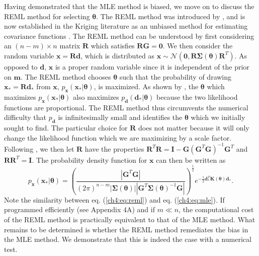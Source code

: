 Having demonstrated that the MLE method is biased, we move on to
discuss the REML method for selecting $\mathbf{\theta}$.  The REML
method was introduced by \citet{Patterson1971}, and is now established
in the Kriging literature as an unbiased method for estimating
covariance functions \citep[e.g.,][]{Cressie1992}. The REML method can
be understood by first considering an $(n-m)\times n$ matrix
$\mathbf{R}$ which satisfies $\mathbf{R}\mathbf{G}=\mathbf{0}$.  We
then consider the random variable $\mathbf{x}=\mathbf{R}\mathbf{d}$,
which is distributed as $\mathbf{x} \sim
\mathcal{N}(\mathbf{0},\mathbf{R}\mathbf{\Sigma}(\mathbf{\theta})\mathbf{R}^T)$.
As opposed to $\mathbf{d}$, $\mathbf{x}$ is a proper random variable
since it is independent of the prior on $\mathbf{m}$. The REML method
chooses $\mathbf{\theta}$ such that the probability of drawing
$\mathbf{x}_*=\mathbf{R}\mathbf{d}_*$ from $\mathbf{x}$,
$p_\mathbf{x}(\mathbf{x}_*|\mathbf{\theta})$, is maximized. As shown
by \citet{Harville1974}, the $\mathbf{\theta}$ which maximizes
$p_\mathbf{x}(\mathbf{x}_*|\mathbf{\theta})$ also maximizes
$p_\mathbf{d}(\mathbf{d}_*|\mathbf{\theta})$ because the two
likelihood functions are proportional. The REML method thus
circumvents the numerical difficulty that $p_\mathbf{d}$ is
infinitesimally small and identifies the $\mathbf{\theta}$ which we
initially sought to find. The particular choice for $\mathbf{R}$ does
not matter because it will only change the likelihood function which
we are maximizing by a scale factor. Following \citet{Harville1974},
we then let $\mathbf{R}$ have the properties $\mathbf{R}^T\mathbf{R} =
\mathbf{I} - \mathbf{G}(\mathbf{G}^T\mathbf{G})^{-1}\mathbf{G}^T$ and
$\mathbf{R}\mathbf{R}^T = \mathbf{I}$. The probability density
function for $\mathbf{x}$ can then be written as
\begin{equation}\label{ch4:eq:reml}
p_\mathbf{x}(\mathbf{x}_*|\mathbf{\theta}) =
\left(\frac{\left|\mathbf{G}^T\mathbf{G}\right|}
           {(2\pi)^{n-m}
            \left| \mathbf{\Sigma}(\mathbf{\theta}) \right| 
            \left| \mathbf{G}^T\mathbf{\Sigma}(\mathbf{\theta})^{-1}\mathbf{G} \right|}\right)^{\frac{1}{2}} 
e^{-\tfrac{1}{2}\mathbf{d}_*^T\mathbf{K}(\mathbf{\theta})\mathbf{d}_*}.
\end{equation}
Note the similarity between eq. (\ref{ch4:eq:reml}) and eq.
(\ref{ch4:eq:mle}). If programmed efficiently (see Appendix 4A) and if
$m \ll n$, the computational cost of the REML method is practically
equivalent to that of the MLE method. What remains to be determined is
whether the REML method remediates the bias in the MLE method. We
demonstrate that this is indeed the case with a numerical test.

